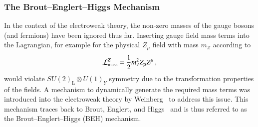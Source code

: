 \subsubsection{The Brout--Englert--Higgs Mechanism}

In the context of the electroweak theory, the non-zero masses of the gauge
bosons (and fermions) have been ignored thus far. Inserting gauge field mass
terms into the Lagrangian, for example for the physical $Z_\mu$ field with mass
$m_Z$ according to
\begin{align*}
  \mathcal{L}_{\text{mass}}^{Z} = \frac{1}{2} m_{Z}^2 Z_\mu Z^\mu \,\text{,}
\end{align*}
would violate $SU(2)_{\text{L}} \otimes U(1)_Y$ symmetry due to the
transformation properties of the fields. A mechanism to dynamically generate the
required mass terms was introduced into the electroweak theory by
Weinberg~\cite{Weinberg:1967tq} to address this issue. This mechanism traces
back to Brout, Englert, and Higgs~\cite{Englert:1964et,Higgs:1964pj} and is thus
referred to as the Brout--Englert--Higgs (BEH) mechanism.

